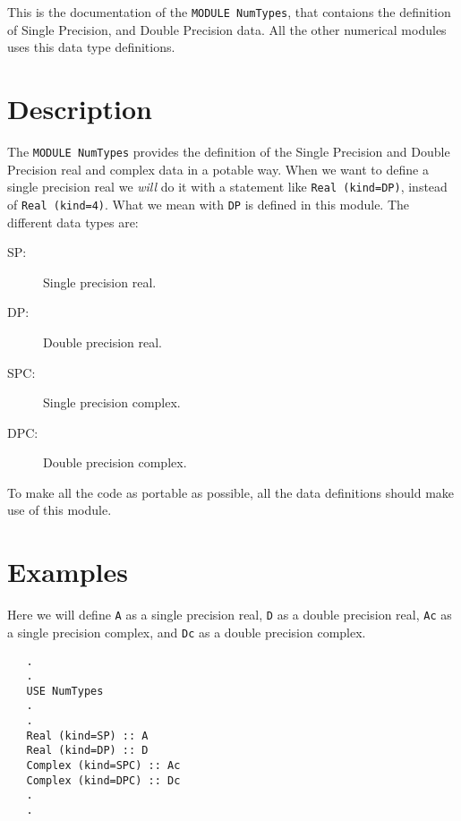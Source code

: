 This is the documentation of the \texttt{MODULE NumTypes}, that
contaions the definition of Single Precision, and Double
Precision data. All the other numerical modules uses this data type
definitions. 


\section{Description}

The \texttt{MODULE NumTypes} provides the definition of the Single
Precision and Double Precision real and complex data in a potable
way. When we want to define a single precision real we \emph{will} do
it with a statement like \texttt{Real (kind=DP)}, instead of
\texttt{Real (kind=4)}. What we mean with \texttt{DP} is defined in
this module. The different data types are:

\begin{description}
\item[SP: ] Single precision real.
\item[DP: ] Double precision real.
\item[SPC: ] Single precision complex.
\item[DPC: ] Double precision complex.
\end{description}

To make all the code as portable as possible, all the data
definitions should make use of this module.

\section{Examples}

Here we will define \texttt{A} as a single precision real, \texttt{D}
as a double precision real, \texttt{Ac} as a single precision complex,
and \texttt{Dc} as a double precision complex.

\begin{verbatim}
   .
   .
   USE NumTypes
   .
   .
   Real (kind=SP) :: A
   Real (kind=DP) :: D
   Complex (kind=SPC) :: Ac
   Complex (kind=DPC) :: Dc
   .
   .
\end{verbatim}

